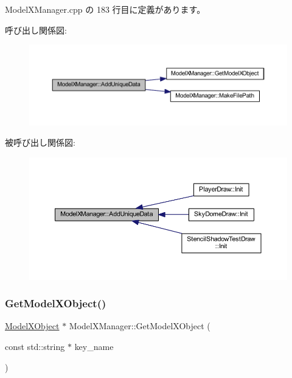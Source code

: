  Model\+X\+Manager.\+cpp の 183 行目に定義があります。

呼び出し関係図\+:\nopagebreak
\begin{figure}[H]
\begin{center}
\leavevmode
\includegraphics[width=350pt]{class_model_x_manager_a0a0cd728e7b92de6c18e96026708d97b_cgraph}
\end{center}
\end{figure}
被呼び出し関係図\+:\nopagebreak
\begin{figure}[H]
\begin{center}
\leavevmode
\includegraphics[width=350pt]{class_model_x_manager_a0a0cd728e7b92de6c18e96026708d97b_icgraph}
\end{center}
\end{figure}
\mbox{\label{class_model_x_manager_a70cc89b8314e5e91b74770606c734c97}} 
\subsubsection{\texorpdfstring{Get\+Model\+X\+Object()}{GetModelXObject()}}
{\footnotesize\ttfamily \mbox{\hyperlink{class_model_x_object}{Model\+X\+Object}} $\ast$ Model\+X\+Manager\+::\+Get\+Model\+X\+Object (\begin{DoxyParamCaption}\item[{const std\+::string $\ast$}]{key\+\_\+name }\end{DoxyParamCaption})\hspace{0.3cm}{\ttfamily [static]}}



